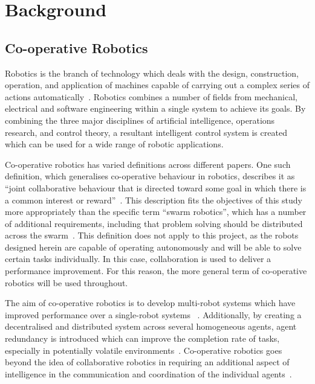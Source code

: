 
\chapter{Background}\label{litreview}

\section{Co-operative Robotics}\label{litreview/robotics}
Robotics is the branch of technology which deals with the design, construction, 
operation, and application of machines capable of carrying out a complex series of 
actions automatically~\cite{robotdef, roboticsdef}. Robotics 
combines a number of fields from mechanical,
electrical and software engineering within a single system to achieve its goals. By 
combining the three major disciplines of artificial intelligence, operations 
research, and control theory, a resultant intelligent control system is created~\cite{saridis1983intelligent} which can be 
used for a wide range of robotic applications.

Co-operative robotics has varied definitions across different papers. One such
definition, which generalises co-operative behaviour in robotics, describes it 
as ``joint collaborative behaviour that is directed toward some goal in which 
there is a common interest or reward''~\cite{barnes1991behaviour}. This 
description fits the objectives of this study more appropriately than the 
specific term ``swarm robotics'',  which has a number of additional requirements, 
including that problem solving should be distributed across the swarm~\cite{sahin04}. This definition does not apply to this project, as the robots 
designed herein are capable of operating autonomously and will be able to solve 
certain tasks individually. In this case, collaboration is used to deliver a 
performance improvement. For this reason, the more general term of co-operative 
robotics will be used throughout. 

The aim of co-operative robotics is to  develop multi-robot systems which have improved performance over a single-robot systems~
\cite{premvuti1990consideration}. Additionally, by creating a decentralised and 
distributed system across several homogeneous agents, agent redundancy is 
introduced which can improve the completion rate of tasks, especially in 
potentially volatile environments~\cite{beckers1994local, parker95}.
Co-operative robotics goes beyond the idea of collaborative robotics in
requiring an additional aspect of intelligence in the communication and
coordination of the individual agents~\cite{cao1995cooperative}.

